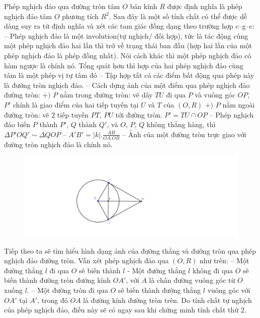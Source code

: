 \begin{multicols}{2}
	Phép nghịch đảo qua đường tròn tâm $O$ bán kính $R$ được định nghĩa là phép nghịch đảo tâm $O$ phương tích $R^2$.
	\vskip 0.1cm
	Sau đây là một số tính chất có thể được dễ dàng suy ra từ định nghĩa và xét các tam giác đồng dạng theo trường hợp c--g--c:
	\vskip 0.1cm
	-- Phép nghịch đảo là một involution(tự nghịch/ đối hợp), tức là tác động cùng một phép nghịch đảo hai lần thì trở về trạng thái ban đầu (hợp hai lần của một phép nghịch đảo là phép đồng nhất). Nói cách khác thì một phép nghịch đảo có hàm ngược là chính nó.
	Tổng quát hơn thì hợp của hai phép nghịch đảo cùng tâm là một phép vị tự tâm đó 
	\vskip 0.1cm
	-- Tập hợp tất cả các điểm bất động qua phép này là đường tròn nghịch đảo. 
	\vskip 0.1cm
	-- Cách dựng ảnh của một điểm qua phép nghịch đảo đường tròn:
	\vskip 0.1cm
	$+)$ $P$ nằm trong đường tròn: vẽ dây $TU$ đi qua $P$ và vuông góc $OP$, $P'$ chính là giao điểm của hai tiếp tuyến tại $U$ và $T$ của $(O, R)$
	\vskip 0.1cm
	$+)$ $P$ nằm ngoài đường tròn: vẽ $2$ tiếp tuyến $PT$, $PU$ tới đường tròn. $P' = TU \cap OP$
	\vskip 0.1cm
	-- Phép nghịch đảo biến $P$ thành $P'$, $Q$ thành $Q'$, và $O$, $P$, $Q$ không thẳng hàng, thì $\Delta  P'OQ' \sim  \Delta QOP$ 
	\vskip 0.1cm
	-- $A'B' = |k|. \frac{AB}{OA.OB}$ 
	\vskip 0.1cm
	-- Ảnh của một đường tròn trực giao với đường tròn nghịch đảo là chính nó.
	\vskip 0.1cm
	\begin{figure}[H]
		\vspace*{-10pt}
		\centering
		\captionsetup{labelformat= empty, justification=centering}
		\includegraphics[width= 0.9\linewidth]{Dung_anh_phep_nghich_dao.pdf}
		\vspace*{-15pt}
	\end{figure}
	Tiếp theo ta sẽ tìm hiểu hình dạng ảnh của đường thẳng và đường tròn qua phép nghịch đảo đường tròn. Vẫn xét phép nghịch đảo qua $(O, R)$ như trên: 
	\vskip 0.1cm
	-- Một đường thẳng $l$ đi qua $O$ sẽ biến thành $l$
	\vskip 0.1cm
	- Một đường thẳng $l$ không đi qua $O$ sẽ biến thành đường tròn đường kính $OA'$, với $A$ là chân đường vuông góc từ $O$ xuống $l$. 
	\vskip 0.1cm 
	-- Một đường tròn đi qua $O$ sẽ biến thành đường thẳng $l$ vuông góc với $OA'$ tại $A'$, trong đó $OA$ là đường kính đường tròn trên. Do tính chất tự nghịch của phép nghịch đảo, điều này sẽ có ngay sau khi chứng minh tính chất thứ $2$.

\end{multicols}
